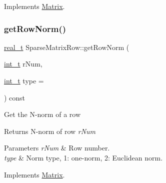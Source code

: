 Implements \hyperlink{class_matrix_a7d7820b8b02f4abcf82330596b317ad6}{Matrix}.

\mbox{\label{class_sparse_matrix_row_a7124d79271aec2f02b47a119b26e86d9}} 
\subsubsection{\texorpdfstring{get\+Row\+Norm()}{getRowNorm()}\hspace{0.1cm}{\footnotesize\ttfamily [1/2]}}
{\footnotesize\ttfamily \hyperlink{qp_o_a_s_e_s__wrapper_8h_a0d00e2b3dfadee81331bbb39068570c4}{real\+\_\+t} Sparse\+Matrix\+Row\+::get\+Row\+Norm (\begin{DoxyParamCaption}\item[{\hyperlink{_types_8hpp_ab6fd6105e64ed14a0c9281326f05e623}{int\+\_\+t}}]{r\+Num,  }\item[{\hyperlink{_types_8hpp_ab6fd6105e64ed14a0c9281326f05e623}{int\+\_\+t}}]{type = {} }\end{DoxyParamCaption}) const\hspace{0.3cm}{\ttfamily [virtual]}}

Get the N-\/norm of a row \begin{DoxyReturn}{Returns}
N-\/norm of row {\itshape r\+Num} 
\end{DoxyReturn}

\begin{DoxyParams}{Parameters}
{\em r\+Num} & Row number. \\
\hline
{\em type} & Norm type, 1\+: one-\/norm, 2\+: Euclidean norm. \\
\hline
\end{DoxyParams}


Implements \hyperlink{class_matrix_ac4c0a395cd507ba0801b731765c586f7}{Matrix}.

\mbox{\label{class_sparse_matrix_row_ab4ee9b14df2b9272aa2dbedccf53efc3}} 
